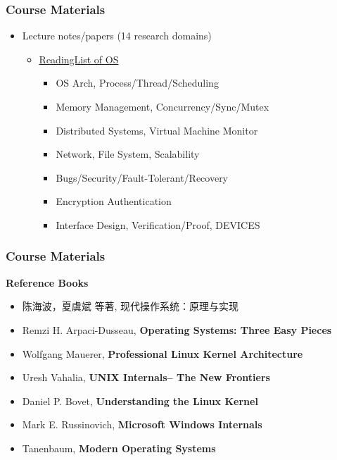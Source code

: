 \begin{frame}[plain]	
	\frametitle{Course Materials}
	
	\begin{itemize}\Large 
		\item Lecture notes/papers (14 research domains)
		
		\begin{itemize}\large 
			\item  \href{https://github.com/chyyuu/aos\_course/blob/master/readinglist.md}{ReadingList of OS}
			\begin{itemize}\large 
				\item OS Arch,  Process/Thread/Scheduling
				\item Memory Management, Concurrency/Sync/Mutex
				\item Distributed Systems, Virtual Machine Monitor
				\item Network, File System, Scalability
				\item Bugs/Security/Fault-Tolerant/Recovery
				\item Encryption Authentication
				\item Interface Design, Verification/Proof, DEVICES
			\end{itemize}
		\end{itemize}
	\end{itemize}
	
\end{frame}

\begin{frame}[plain]	
	\frametitle{Course Materials}
	\Large 
	\textbf{Reference Books}
	\begin{itemize}\large 
        \item 陈海波，夏虞斌 等著, 现代操作系统：原理与实现
        \item Remzi H. Arpaci-Dusseau, \textbf{Operating Systems: Three Easy Pieces}
		\item Wolfgang Mauerer, \textbf{Professional Linux Kernel Architecture}
		\item Uresh Vahalia, \textbf{UNIX Internals-- The New Frontiers}
		\item Daniel P. Bovet, \textbf{Understanding the Linux Kernel}
		\item Mark E. Russinovich,\textbf{ Microsoft Windows Internals}
		\item Tanenbaum, \textbf{Modern Operating Systems}

	\end{itemize}
	
\end{frame}



